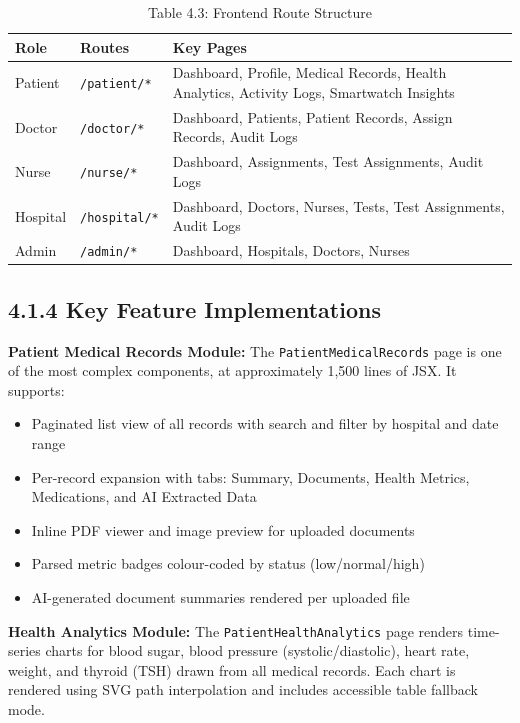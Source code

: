\documentclass[12pt,a4paper]{report}
\begin{document}
\begin{table}[H]
\centering
\caption{Table 4.3: Frontend Route Structure}
\begin{tabular}{lll}
\toprule
\textbf{Role} & \textbf{Routes} & \textbf{Key Pages} \\
\midrule
Patient & \texttt{/patient/*} & Dashboard, Profile, Medical Records, Health Analytics, Activity Logs, Smartwatch Insights \\
Doctor & \texttt{/doctor/*} & Dashboard, Patients, Patient Records, Assign Records, Audit Logs \\
Nurse & \texttt{/nurse/*} & Dashboard, Assignments, Test Assignments, Audit Logs \\
Hospital & \texttt{/hospital/*} & Dashboard, Doctors, Nurses, Tests, Test Assignments, Audit Logs \\
Admin & \texttt{/admin/*} & Dashboard, Hospitals, Doctors, Nurses \\
\bottomrule
\end{tabular}
\end{table}

\subsection{4.1.4 Key Feature Implementations}

\textbf{Patient Medical Records Module:}
The \texttt{PatientMedicalRecords} page is one of the most complex components, at approximately 1,500 lines of JSX. It supports:
\begin{itemize}
    \item Paginated list view of all records with search and filter by hospital and date range
    \item Per-record expansion with tabs: Summary, Documents, Health Metrics, Medications, and AI Extracted Data
    \item Inline PDF viewer and image preview for uploaded documents
    \item Parsed metric badges colour-coded by status (low/normal/high)
    \item AI-generated document summaries rendered per uploaded file
\end{itemize}

\textbf{Health Analytics Module:}
The \texttt{PatientHealthAnalytics} page renders time-series charts for blood sugar, blood pressure (systolic/diastolic), heart rate, weight, and thyroid (TSH) drawn from all medical records. Each chart is rendered using SVG path interpolation and includes accessible table fallback mode.
\end{document}
